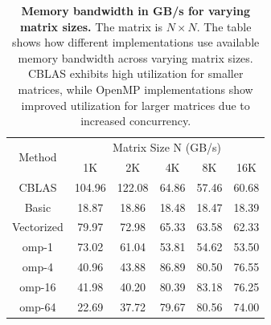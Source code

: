 \begin{table}[h!]
\centering
\begin{tabular}{|c|c|c|c|c|c|}
\hline
\multirow{2}{*}{Method} & \multicolumn{5}{c|}{Matrix Size N (GB/s)} \\ \cline{2-6} 
                        & 1K      & 2K      & 4K      & 8K      & 16K     \\ \hline
CBLAS                   & 104.96  & 122.08  & 64.86   & 57.46   & 60.68   \\ \hline
Basic                   & 18.87   & 18.86   & 18.48   & 18.47   & 18.39   \\ \hline
Vectorized              & 79.97   & 72.98   & 65.33   & 63.58   & 62.33   \\ \hline
omp-1                   & 73.02   & 61.04   & 53.81   & 54.62   & 53.50   \\ \hline
omp-4                   & 40.96   & 43.88   & 86.89   & 80.50   & 76.55   \\ \hline
omp-16                  & 41.98   & 40.20   & 80.39   & 83.18   & 76.25   \\ \hline
omp-64                  & 22.69   & 37.72   & 79.67   & 80.56   & 74.00   \\ \hline
\end{tabular}
\caption{\textbf{Memory bandwidth in GB/s for varying matrix sizes.} The matrix is \(N \times N\). The table shows how different implementations use available memory bandwidth across varying matrix sizes. CBLAS exhibits high utilization for smaller matrices, while OpenMP implementations show improved utilization for larger matrices due to increased concurrency.}
\label{tab:memory-bandwidth-gbps}
\end{table}

